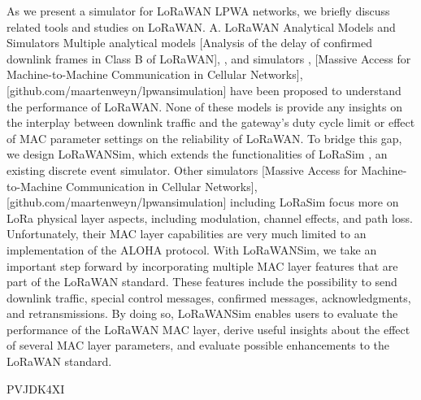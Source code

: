As we present a simulator for LoRaWAN LPWA networks,
	we briefly discuss related tools and studies on LoRaWAN.
A.
LoRaWAN Analytical Models and Simulators Multiple analytical models [Analysis of the delay of conﬁrmed downlink frames in Class B of LoRaWAN],
	\cite{georgiou_low_2017},
	\cite{toussaint_performance_2016} and simulators \cite{bor_lora_2016},
	[Massive Access for Machine-to-Machine Communication in Cellular Networks],
	[github.com/maartenweyn/lpwansimulation] have been proposed to understand the performance of LoRaWAN.
None of these models is provide any insights on the interplay between downlink traffic and the gateway’s duty cycle limit or effect of MAC parameter settings on the reliability of LoRaWAN.
To bridge this gap,
	we design LoRaWANSim,
	which extends the functionalities of LoRaSim \cite{bor_lora_2016},
	an existing discrete event simulator.
Other simulators [Massive Access for Machine-to-Machine Communication in Cellular Networks],
	[github.com/maartenweyn/lpwansimulation] including LoRaSim focus more on LoRa physical layer aspects,
	including modulation,
	channel effects,
	and path loss.
Unfortunately,
	their MAC layer capabilities are very much limited to an implementation of the ALOHA protocol.
With LoRaWANSim,
	we take an important step forward by incorporating multiple MAC layer features that are part of the LoRaWAN standard.
These features include the possibility to send downlink traffic,
	special control messages,
	confirmed messages,
	acknowledgments,
	and retransmissions.
By doing so,
	LoRaWANSim enables users to evaluate the performance of the LoRaWAN MAC layer,
	derive useful insights about the effect of several MAC layer parameters,
	and evaluate possible enhancements to the LoRaWAN standard.

\cite{sandoval_optimal_2018} PVJDK4XI

